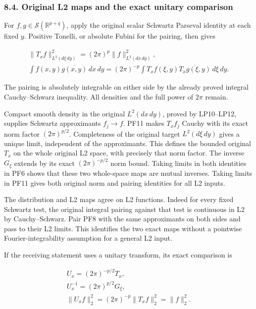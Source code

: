 \documentclass[
  11pt,
]{article}
\begin{document}
\subsubsection{8.4. Original L2 maps and the exact unitary
comparison}\label{original-l2-maps-and-the-exact-unitary-comparison}

For \(f,g\in\mathcal S(\mathbb R^{p+q})\), apply the original scalar
Schwartz Parseval identity at each fixed \(y\). Positive Tonelli, or
absolute Fubini for the pairing, then gives

\[
\begin{aligned}
 \|T_xf\|_{L^2(d\xi\,dy)}^2
       =(2\pi)^p\|f\|_{L^2(dx\,dy)}^2,
 \qquad\\
 \int f(x,y)\overline{g(x,y)}\,dx\,dy
       =(2\pi)^{-p}
         \int T_xf(\xi,y)\overline{T_xg(\xi,y)}\,d\xi\,dy.
 \end{aligned}
\tag{PF11}
\]

The pairing is absolutely integrable on either side by the already
proved integral Cauchy--Schwarz inequality. All densities and the full
power of \(2\pi\) remain.

Compact smooth density in the original \(L^2(dx\,dy)\), proved by
LP10--LP12, supplies Schwartz approximants \(f_j\to f\). PF11 makes
\(T_xf_j\) Cauchy with its exact norm factor \((2\pi)^{p/2}\).
Completeness of the original target \(L^2(d\xi\,dy)\) gives a unique
limit, independent of the approximants. This defines the bounded
original \(T_x\) on the whole original L2 space, with precisely that
norm factor. The inverse \(G_\xi\) extends by its exact
\((2\pi)^{-p/2}\) norm bound. Taking limits in both identities in PF6
shows that these two whole-space maps are mutual inverses. Taking limits
in PF11 gives both original norm and pairing identities for all L2
inputs.

The distribution and L2 maps agree on L2 functions. Indeed for every
fixed Schwartz test, the original integral pairing against that test is
continuous in L2 by Cauchy--Schwarz. Pair PF8 with the same approximants
on both sides and pass to their L2 limits. This identifies the two exact
maps without a pointwise Fourier-integrability assumption for a general
L2 input.

If the receiving statement uses a unitary transform, its exact
comparison is

\[
\begin{aligned}
 U_x=(2\pi)^{-p/2}T_x,\qquad\\
 U_x^{-1}=(2\pi)^{p/2}G_\xi,\qquad\\
 \|U_xf\|_2^2=(2\pi)^{-p}\|T_xf\|_2^2=\|f\|_2^2.
 \end{aligned}
\tag{PF12}
\]
\end{document}
